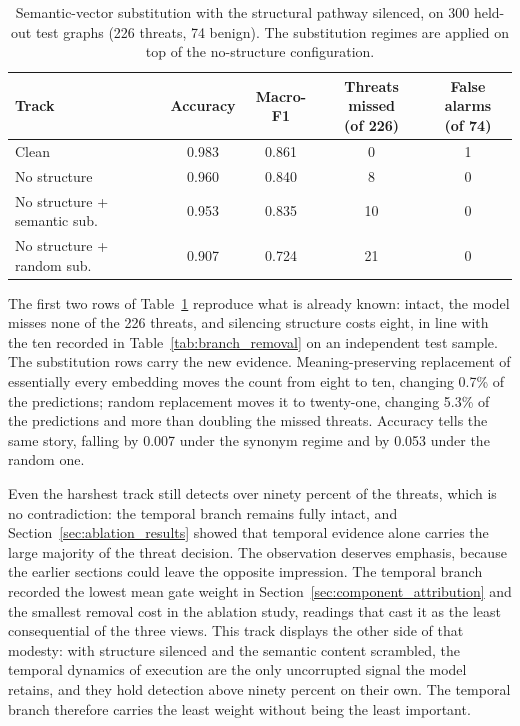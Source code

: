 \documentclass[%
    BCOR=10mm,
    DIV=13,
    toc=bibliography,
    toc=listof,
    oneside,
    12pt,
]{scrbook}
\begin{document}
\begin{table}[htbp]
\centering
\caption[Substitution under forced semantic reliance]{Semantic-vector
substitution with the structural pathway silenced, on 300 held-out test
graphs (226 threats, 74 benign). The substitution regimes are applied on top
of the no-structure configuration.}
\label{tab:semantic_sub_no_structure}
\small
\setlength{\tabcolsep}{4pt}
\begin{tabular}{l c c c c}
\toprule
Track & Accuracy & Macro-F1 & \makecell[c]{Threats missed\\(of 226)} &
\makecell[c]{False alarms\\(of 74)} \\
\midrule
Clean                        & 0.983 & 0.861 & 0  & 1 \\
No structure                 & 0.960 & 0.840 & 8  & 0 \\
No structure + semantic sub. & 0.953 & 0.835 & 10 & 0 \\
No structure + random sub.   & 0.907 & 0.724 & 21 & 0 \\
\bottomrule
\end{tabular}
\end{table}

The first two rows of Table~\ref{tab:semantic_sub_no_structure} reproduce
what is already known: intact, the model misses none of the 226 threats, and
silencing structure costs eight, in line with the ten recorded in
Table~\ref{tab:branch_removal} on an independent test sample. The
substitution rows carry the new evidence. Meaning-preserving replacement of
essentially every embedding moves the count from eight to ten, changing
0.7\% of the predictions; random replacement moves it to twenty-one,
changing 5.3\% of the predictions and more than doubling the missed threats.
Accuracy tells the same story, falling by 0.007 under the synonym regime and
by 0.053 under the random one.

Even the harshest track still detects over ninety percent of the
threats, which is no contradiction: the temporal branch remains fully intact, and
Section~\ref{sec:ablation_results} showed that temporal evidence alone
carries the large majority of the threat decision. The observation deserves
emphasis, because the earlier sections could leave the opposite impression.
The temporal branch recorded the lowest mean gate weight in
Section~\ref{sec:component_attribution} and the smallest removal cost in the
ablation study, readings that cast it as the least consequential of the
three views. This track displays the other side of that modesty: with
structure silenced and the semantic content scrambled, the temporal
dynamics of execution are the only uncorrupted signal the model retains, and
they hold detection above ninety percent on their own. The temporal branch
therefore carries the least weight without being the least important.
\end{document}
